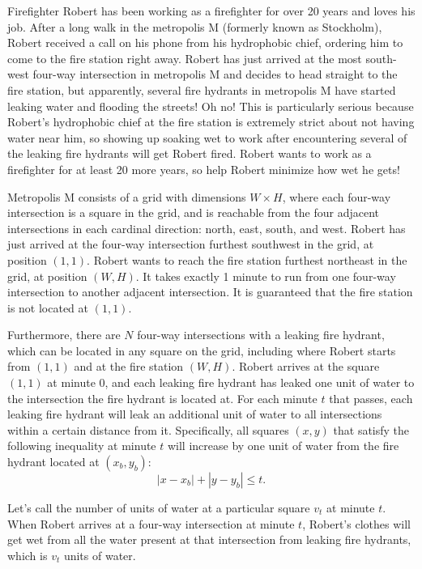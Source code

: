\noindent
Firefighter Robert has been working as a firefighter for over 20 years and loves his job. 
After a long walk in the metropolis M (formerly known as Stockholm), Robert received a 
call on his phone from his hydrophobic chief, ordering him to come to the fire station 
right away. Robert has just arrived at the most south-west four-way intersection in 
metropolis M and decides to head straight to the fire station, but apparently, 
several fire hydrants in metropolis M have started leaking water and flooding the streets! 
Oh no! This is particularly serious because Robert's hydrophobic chief at the fire 
station is extremely strict about not having water near him, so showing up soaking 
wet to work after encountering several of the leaking fire hydrants will get Robert fired. 
Robert wants to work as a firefighter for at least 20 more years, so help Robert 
minimize how wet he gets!

Metropolis M consists of a grid with dimensions $W \times H$, where each four-way 
intersection is a square in the grid, and is reachable from the four adjacent 
intersections in each cardinal direction: north, east, south, and west. 
Robert has just arrived at the four-way intersection furthest southwest in the grid, 
at position $(1,1)$. Robert wants to reach the fire station furthest northeast in the grid, 
at position $(W,H)$. It takes exactly 1 minute to run from one four-way intersection to another 
adjacent intersection. It is guaranteed that the fire station is not located at $(1,1)$. 

Furthermore, there are $N$ four-way intersections with a leaking fire hydrant, 
which can be located in any square on the grid, including where Robert starts from $(1,1)$ and 
at the fire station $(W,H)$. Robert arrives at the square $(1,1)$ at minute 0, and each leaking 
fire hydrant has leaked one unit of water to the intersection the fire hydrant is located at. 
For each minute $t$ that passes, each leaking fire hydrant will leak an additional unit of water 
to all intersections within a certain distance from it. Specifically, all squares $(x,y)$ that 
satisfy the following inequality at minute $t$ will increase by one unit of water from the fire 
hydrant located at $(x_b,y_b)$:
$$
|x-x_b|+|y-y_b|\le t.
$$

Let's call the number of units of water at a particular square $v_t$ at minute $t$. 
When Robert arrives at a four-way intersection at minute $t$, Robert's clothes will get wet 
from all the water present at that intersection from leaking fire hydrants, which is $v_t$ units of water.

